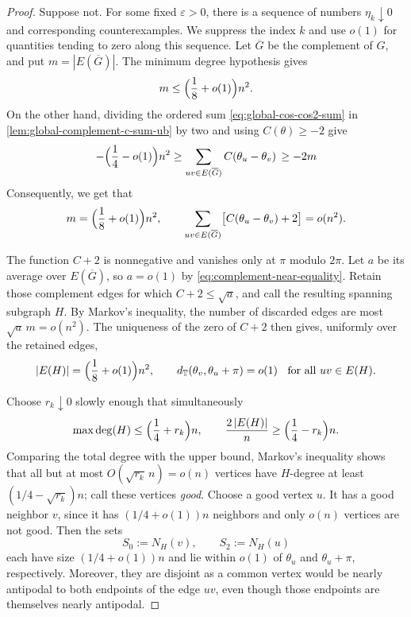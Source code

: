 \documentclass[reqno,11pt]{amsart}
\theoremstyle{definition}
\newcommand{\T}{\mathbb{T}}
\newcommand{\abs}[1]{\left\lvert #1\right\rvert}
\newcommand{\distT}{d_{\T}}
\begin{document}
\begin{proof}
Suppose not.  For some fixed $\varepsilon>0$, there is a sequence of
numbers $\eta_k\downarrow0$ and corresponding counterexamples.  We suppress the index $k$ and use $o(1)$ for quantities tending to zero along
this sequence. Let $\overline G$ be the complement of $G$, and put
$m=|{E(\overline G)}|$.  The minimum degree hypothesis gives
\[
    m\le\Bigl(\frac18+o(1)\Bigr)n^2.
\]
On the other hand, dividing the ordered sum \eqref{eq:global-cos-cos2-sum} in
\cref{lem:global-complement-c-sum-ub} by two and using $C(\theta)\ge-2$ give
\[
-\Bigl({\frac14-o(1)}\Bigr)n^2 \geq  \sum_{uv\in E(\overline G)}C(\theta_u-\theta_v) \, \geq -2m
\]
Consequently, we get that 
\begin{equation}\label{eq:complement-near-equality}
    m=\Bigl({\frac18+o(1)}\Bigr)n^2,
    \qquad
    \sum_{uv\in E(\overline G)}
       \bigl[C(\theta_u-\theta_v)+2\bigr]=o(n^2).
\end{equation}

The function $C+2$ is nonnegative and vanishes only at $\pi$ modulo $2\pi$.  Let $a$ be its average over $E(\overline G)$, so $a=o(1)$ by
\eqref{eq:complement-near-equality}.  Retain those complement edges for
which $C+2\le\sqrt a$, and call the
resulting spanning subgraph $H$. By Markov's inequality, the number of discarded edges are most
$\sqrt a\,m=o(n^2)$.  The uniqueness of the zero of $C+2$ then gives, uniformly over the retained edges,
\begin{equation}\label{eq:h-asymptotic-properties}
    \abs{E(H)}=\Bigl({\frac18+o(1)}\Bigr)n^2,
    \qquad
    \distT(\theta_v,\theta_u+\pi)=o(1)
    \;\; \text{ for all } uv\in E(H).
\end{equation}

Choose $r_k\downarrow0$ slowly enough that simultaneously
\[
    \max \deg (H)\le\Bigl({\frac14+r_k}\Bigr)n,
    \qquad
    \frac{2\abs{E(H)}}n\ge\Bigl({\frac14-r_k}\Bigr)n.
\]
Comparing the total degree with the upper bound, Markov's inequality shows that all but at most $O(\sqrt{r_k}\,n)=o(n)$ vertices have $H$-degree at least $(1/4-\sqrt{r_k})n$; call these vertices \emph{good}.  Choose a good vertex $u$.
It has a good neighbor $v$, since it has $(1/4+o(1))n$ neighbors and only
$o(n)$ vertices are not good. Then the sets 
\[
    S_0:=N_H(v),\qquad S_2:=N_H(u)
\]
each have size $(1/4+o(1))n$ and lie within $o(1)$ of $\theta_u$ and
$\theta_u+\pi$, respectively.  Moreover, they are disjoint as  a
common vertex would be nearly antipodal to both endpoints of the edge $uv$, even though those endpoints are themselves nearly antipodal.


\end{proof}
\end{document}
